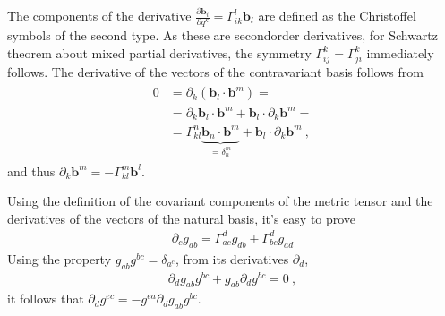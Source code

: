 \documentclass[letterpaper,10pt,english]{jupyterBook}
\begin{document}
\sphinxAtStartPar
{} The components of the derivative \(\frac{\partial \mathbf{b}_i}{\partial q^k} = \Gamma_{ik}^l\mathbf{b}_l\) are defined as the Christoffel symbols of the second type. As these are second\sphinxhyphen{}order derivatives, for Schwartz theorem about mixed partial derivatives, the symmetry \(\Gamma_{ij}^k = \Gamma_{ji}^k\) immediately follows. The derivative of the vectors of the contravariant basis follows from
\begin{equation*}
\begin{split}\begin{aligned}
  0
  & = \partial_{k} \left( \mathbf{b}_l \cdot \mathbf{b}^m \right) = \\
  & = \partial_{k} \mathbf{b}_l \cdot \mathbf{b}^m + \mathbf{b}_l \cdot \partial_k \mathbf{b}^m = \\
  & = \Gamma_{kl}^{n} \underbrace{ \mathbf{b}_n \cdot \mathbf{b}^m}_{ = \delta_{n}^m} + \mathbf{b}_l \cdot \partial_k \mathbf{b}^m \ ,
\end{aligned}\end{split}
\end{equation*}
\sphinxAtStartPar
and thus \(\partial_k \mathbf{b}^m = - \Gamma_{kl}^{m} \mathbf{b}^l\).

\sphinxAtStartPar
{} Using the definition of the covariant components of the metric tensor and the derivatives of the vectors of the natural basis, it’s easy to prove
\begin{equation}\label{equation:ch/relativity-general/differential-geometry:eq:metric-compatibility}
\begin{split}\partial_c g_{ab} = \Gamma_{ac}^{d} g_{db} + \Gamma_{bc}^{d} g_{ad}\end{split}
\end{equation}
\sphinxAtStartPar
Using the property \(g_{ab} g^{bc} = \delta_{a^c}\), from its derivatives \(\partial_d\),
\begin{equation*}
\begin{split}\partial_d g_{ab} g^{bc} + g_{ab} \partial_d g^{bc} = 0 \ ,\end{split}
\end{equation*}
\sphinxAtStartPar
it follows that \(\partial_d g^{ec} = - g^{ea} \partial_d g_{ab} g^{bc}\).
\end{document}
